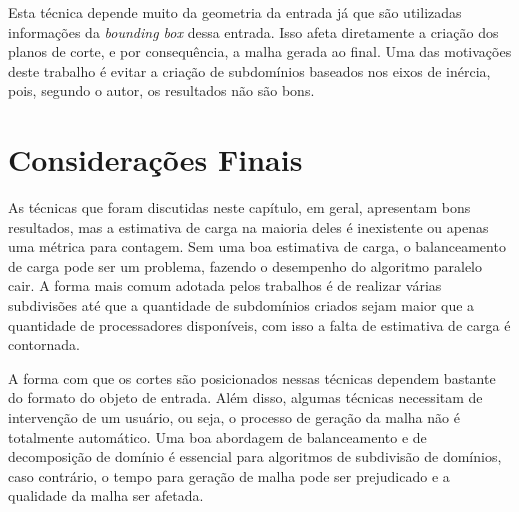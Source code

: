 Esta técnica depende muito da geometria da entrada já que são utilizadas informações da \textit{bounding box} dessa entrada. Isso afeta diretamente a criação dos planos de corte, e por consequência, a malha gerada ao final. Uma das motivações deste trabalho é evitar a criação de subdomínios baseados nos eixos de inércia, pois, segundo o autor, os  resultados não são bons.

\section{Considerações Finais}


As técnicas que foram discutidas neste capítulo, em geral, apresentam bons resultados, mas a estimativa de carga na maioria deles é inexistente ou apenas uma métrica para contagem. Sem uma boa estimativa de carga, o balanceamento de carga pode ser um problema, fazendo o desempenho do algoritmo paralelo cair. A forma mais comum adotada pelos trabalhos é de realizar várias subdivisões até que a quantidade de subdomínios criados sejam maior que a quantidade de processadores disponíveis, com isso a falta de estimativa de carga é contornada.

A forma com que os cortes são posicionados nessas técnicas dependem bastante do formato do objeto de entrada. Além disso, algumas técnicas necessitam de intervenção de um usuário, ou seja, o processo de geração da malha não é totalmente automático. Uma boa abordagem de balanceamento e de decomposição de domínio é essencial para algoritmos de subdivisão de domínios, caso contrário, o tempo para geração de malha pode ser prejudicado e a qualidade da malha ser afetada.
